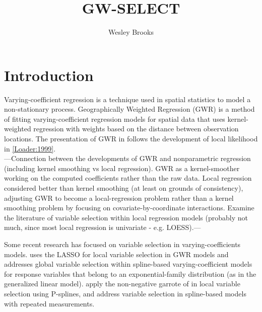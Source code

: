 \documentclass[authoryear, review, 11pt]{elsarticle}
\title{GW-SELECT}
\author{Wesley Brooks}
\date{}                                           %
\begin{document}
\maketitle





\section{Introduction}
	Varying-coefficient regression \cite{Hastie:1993} is a technique used in spatial statistics to model a non-stationary process. Geographically Weighted Regression (GWR) \cite{Fotheringham:2002} is a method of fitting varying-coefficient regression models for spatial data that uses kernel-weighted regression with weights based on the distance between observation locations. The presentation of GWR in \cite{Fotheringham:2002} follows the development of local likelihood in \ref{Loader:1999}.\\
	
	---Connection between the developments of GWR and nonparametric regression (including kernel smoothing vs local regression). GWR as a kernel-smoother working on the computed coefficients rather than the raw data. Local regression considered better than kernel smoothing (at least on grounds of consistency), adjusting GWR to become a local-regression problem rather than a kernel smoothing problem by focusing on covariate-by-coordinate interactions. Examine the literature of variable selection within local regression models (probably not much, since most local regression is univariate - e.g. LOESS).---
	
	Some recent research has focused on variable selection in varying-coefficients models. \cite{Wheeler:2009} uses the LASSO for local variable selection in GWR models and \cite{Fan:1999} addresses global variable selection within spline-based varying-coefficient models for response variables that belong to an exponential-family distribution (as in the generalized linear model). \cite{Antoniadis:2011} apply the non-negative garrote of \cite{Breiman:1995} in local variable selection using P-splines, and \cite{Wang:2008} address variable selection in spline-based models with repeated measurements.\\
	
\end{document}
